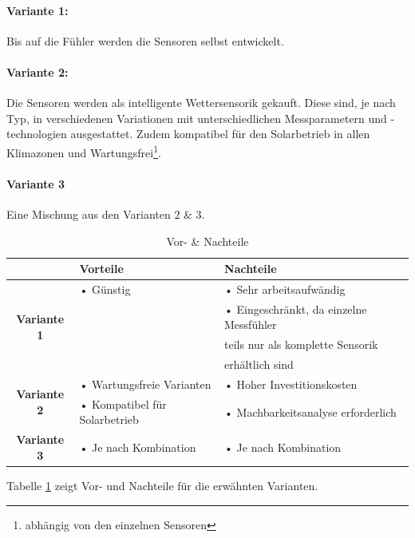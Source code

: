 \paragraph{Variante 1:}

Bis auf die Fühler werden die Sensoren selbst entwickelt.\\

\paragraph{Variante 2:}

Die Sensoren werden als intelligente Wettersensorik gekauft. Diese sind, je nach Typ, in verschiedenen Variationen mit unterschiedlichen Messparametern und -technologien ausgestattet. Zudem kompatibel für den Solarbetrieb in allen Klimazonen und Wartungsfrei\footnote{abhängig von den einzelnen Sensoren}.\\

\newpage
\paragraph{Variante 3}

Eine Mischung aus den Varianten 2 \& 3.\\

\begin{table}[h]
  \centering
  \label{tab:mcu}
  \small
  \caption{Vor- \& Nachteile}
    \begin{tabular}{c|l|l}
          & \textbf{Vorteile} & \textbf{Nachteile} \\
    \toprule
    \multirow{4}[2]{*}{\textbf{Variante 1}} & • Günstig & • Sehr arbeitsaufwändig \\
          &  & • Eingeschränkt, da einzelne Messfühler \\
          &  & \hspace{0.3cm} teils nur als komplette Sensorik \\
          &  & \hspace{0.3cm} erhältlich sind \\
    \hline
    \multirow{2}[1]{*}{\textbf{Variante 2}} & • Wartungsfreie Varianten & • Hoher Investitionskosten \\
          & • Kompatibel für Solarbetrieb & • Machbarkeitsanalyse erforderlich \\
    \hline
    \multirow{4}[1]{*}{\textbf{Variante 3}} &  &   \\
          & •  Je nach Kombination & •  Je nach Kombination  \\
          &    &  \\
    \end{tabular}%
  \label{tab:sensoren}
\end{table}
Tabelle \ref{tab:sensoren} zeigt Vor- und Nachteile für die erwähnten Varianten.\\

